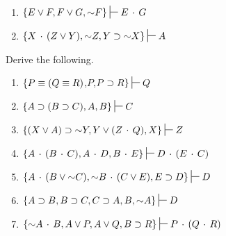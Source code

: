\begin{enumerate}[label=(\arabic*)]
\item $\{E \eor F, F \eor G, \enot F\} \sststile{}{} E \eand G$



\item $\{X \eand (Z \eor Y), \enot Z, Y \eif \enot X\} \sststile{}{} A$  %


\end{enumerate}



\noindent\problempart Derive the following.
\begin{enumerate}[label=(\arabic*)]

\item $\{P \equiv (Q \equiv R)$,$ P$,$ P \eif R\} \sststile{}{} Q$

\item $\{A \eif (B \eif C), A, B\} \sststile{}{}C$
\item $\{(X \eor A) \eif \enot Y, Y \eor (Z \eand Q), X\} \sststile{}{}Z	$
\item $\{A \eand (B \eand C), A \eand D, B \eand E\} \sststile{}{}D \eand (E \eand C)		$
\item $\{A \eand (B \eor \enot C), \enot B \eand (C \eor E), E \eif D \} \sststile{}{} D$


\item $\{A \eif B, B \eif C, C \eif A, B, \enot A\} \sststile{}{}D	$  %
\item $\{\enot A \eand B, A \eor P, A \eor Q, B \eif R \} \sststile{}{} P \eand (Q\eand R)$


\end{enumerate}

